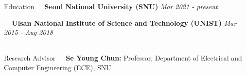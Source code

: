 \documentclass{resume} %
\begin{document}
\begin{rSection}{Education}
\textbullet~\,\, {\bf Seoul National University (SNU)} \hfill {\it Mar 2021 - present}
\\\hspace*{1.5em}{Combined M.S./Ph.D Program in Electrical and Computer Engineering (ECE)} 

\textbullet~\,\, {\bf Ulsan National Institute of Science and Technology (UNIST)} \hfill {\it Mar 2015 - Aug 2018}
\\\hspace*{1.5em}{B.S. in Electical Engineering, GPA: 4.04/4.30}\\

\end{rSection}
\begin{rSection}{Research Advisor}
\textbullet~\,\,\,\,{\bf Se Young Chun:}{ Professor, Department of Electrical and Computer Engineering (ECE), SNU} \\
\end{rSection}
\end{document}
